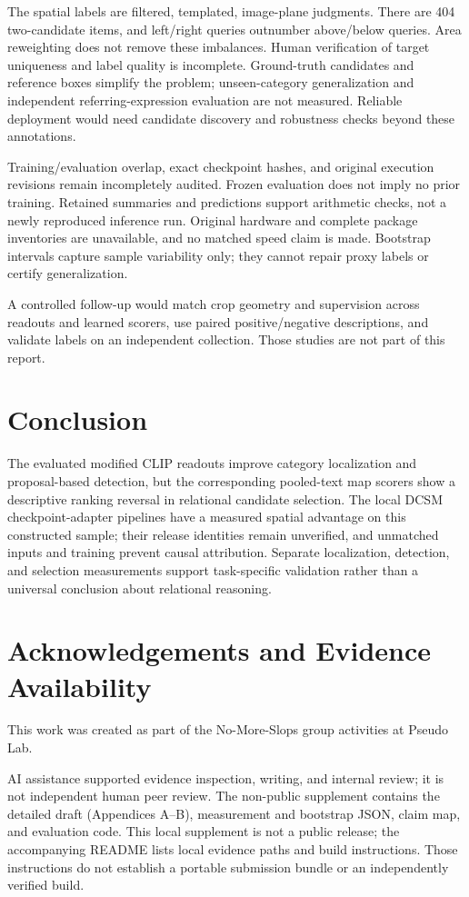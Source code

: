 \documentclass[10pt,twocolumn,letterpaper]{article}
\begin{document}
The spatial labels are filtered, templated, image-plane judgments. There
are 404 two-candidate items, and left/right queries outnumber
above/below queries. Area reweighting does not remove these imbalances.
Human verification of target uniqueness and label quality is incomplete.
Ground-truth candidates and reference boxes simplify the problem;
unseen-category generalization and independent referring-expression
evaluation are not measured. Reliable deployment would need candidate
discovery and robustness checks beyond these annotations.

Training/evaluation overlap, exact checkpoint hashes, and original
execution revisions remain incompletely audited. Frozen evaluation does
not imply no prior training. Retained summaries and predictions support
arithmetic checks, not a newly reproduced inference run. Original
hardware and complete package inventories are unavailable, and no
matched speed claim is made. Bootstrap intervals capture sample
variability only; they cannot repair proxy labels or certify
generalization.

A controlled follow-up would match crop geometry and supervision across
readouts and learned scorers, use paired positive/negative descriptions,
and validate labels on an independent collection. Those studies are not
part of this report.

\section{Conclusion}\label{conclusion}

The evaluated modified CLIP readouts improve category localization and
proposal-based detection, but the corresponding pooled-text map scorers
show a descriptive ranking reversal in relational candidate selection.
The local DCSM checkpoint-adapter pipelines have a measured spatial
advantage on this constructed sample; their release identities remain
unverified, and unmatched inputs and training prevent causal
attribution. Separate localization, detection, and selection
measurements support task-specific validation rather than a universal
conclusion about relational reasoning.

\section{Acknowledgements and Evidence
Availability}\label{acknowledgements-and-evidence-availability}

This work was created as part of the No-More-Slops group activities at
Pseudo Lab.

AI assistance supported evidence inspection, writing, and internal
review; it is not independent human peer review. The non-public
supplement contains the detailed draft (Appendices A--B), measurement
and bootstrap JSON, claim map, and evaluation code. This local
supplement is not a public release; the accompanying README lists local
evidence paths and build instructions. Those instructions do not
establish a portable submission bundle or an independently verified
build.

\label{main-text-end}
\clearpage
\nobalance


\end{document}
